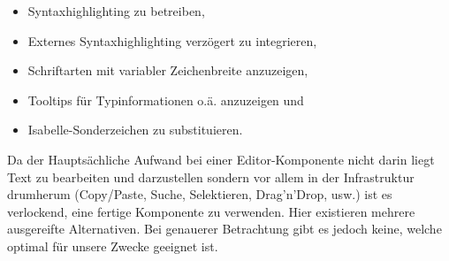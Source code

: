 \begin{itemize}
  \item Syntaxhighlighting zu betreiben,
  \item Externes Syntaxhighlighting verzögert zu integrieren,
  \item Schriftarten mit variabler Zeichenbreite anzuzeigen,
  \item Tooltips für Typinformationen o.ä. anzuzeigen und
  \item Isabelle-Sonderzeichen zu substituieren.
\end{itemize}

Da der Hauptsächliche Aufwand bei einer Editor-Komponente nicht darin liegt Text zu bearbeiten und
darzustellen sondern vor allem in der Infrastruktur drumherum (Copy/Paste, Suche, Selektieren,
Drag'n'Drop, usw.) ist es verlockend, eine fertige Komponente zu verwenden. Hier existieren mehrere
ausgereifte Alternativen. Bei genauerer Betrachtung gibt es jedoch keine, welche optimal für unsere
Zwecke geeignet ist. 


